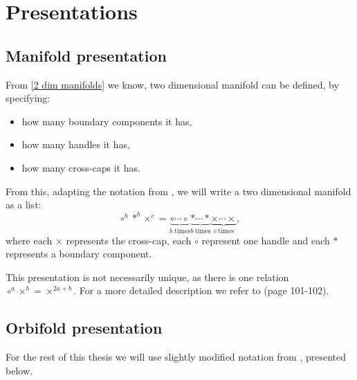 \section{Presentations}\label{therminology and notation}
\subsection{Manifold presentation}
From \ref{2 dim manifolds} we know, two dimensional manifold 
can be 
defined, by specifying:
\begin{itemize}
\item how many boundary components it has,
\item how many handles it has,
\item how many cross-caps it has.
\end{itemize} 
From this, adapting the notation from \cite{Conway2016}, we will write 
a two dimensional manifold as a list: 
\begin{equation}
\circ^h*^b\times^c = \underbrace{\circ\cdots\circ}_{h\ \mathrm{times}} 
\underbrace{*\cdots*}_{b\ \mathrm{times}}\underbrace{\times\cdots \times }_{c\ \mathrm{times}},
\end{equation}
where each $\times$ represents the cross-cap, 
each $\circ$ represent one handle and each $*$ represents a boundary component.

This presentation is not necessarily unique, as 
there is one relation $\circ^a\times^b = \times^{2a+b}$. For a more 
detailed description we refer to \cite{Conway2016} (page 101-102).

\subsection{Orbifold presentation}
For the rest of this thesis we will use slightly modified notation from \cite{Conway2016}, 
presented below.

